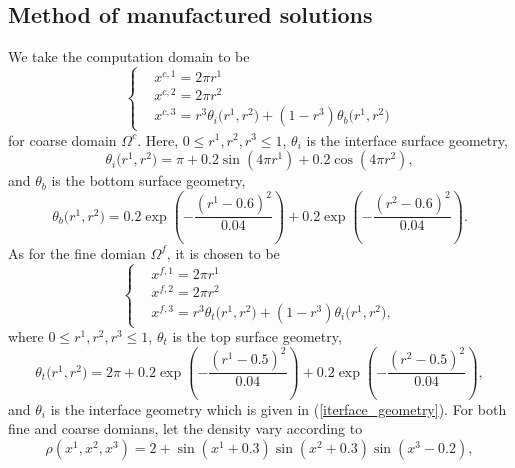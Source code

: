 \subsection{Method of manufactured solutions}\label{manufactured_sol}
We take the computation domain to be 
\begin{equation}\label{coarse_domain_manufactured}
\left\{
\begin{aligned}
& x^{c,1} = 2\pi r^1\\
& x^{c,2} = 2\pi r^2\\
& x^{c,3} = r^3\theta_i\big(r^1,r^2\big) + (1-r^3)\theta_b\big(r^1,r^2\big)
\end{aligned}
\right.
\end{equation}
for coarse domain $\Omega^c$. Here, $0\leq r^1, r^2, r^3\leq 1$, $\theta_i$ is the interface surface geometry,
\begin{equation}\label{iterface_geometry}
\theta_i\big(r^1,r^2\big) = \pi+0.2\sin(4\pi r^1)+0.2\cos(4\pi r^2),
\end{equation}
and 
$\theta_b$ is the bottom surface geometry,
\begin{equation}\label{bottom_geometry}
\theta_b\big(r^1,r^2\big) = 0.2\exp\left(-\frac{(r^1-0.6)^2}{0.04}\right)+0.2\exp\left(-\frac{(r^2-0.6)^2}{0.04}\right).
\end{equation}
As for the fine domian $\Omega^f$, it is chosen to be
\begin{equation}\label{fine_domain_manufactured}
\left\{
\begin{aligned}
& x^{f,1} = 2\pi r^1\\
& x^{f,2} = 2\pi r^2\\
& x^{f,3} = r^3\theta_t\big(r^1,r^2\big) + (1-r^3)\theta_i\big(r^1,r^2\big),
\end{aligned}
\right.
\end{equation}
where $0\leq r^1, r^2, r^3\leq 1$, $\theta_t$ is the top surface geometry,
\begin{equation}\label{top_geometry}
\theta_t\big(r^1,r^2\big) = 2\pi+0.2\exp\left(-\frac{(r^1-0.5)^2}{0.04}\right)+0.2\exp\left(-\frac{(r^2-0.5)^2}{0.04}\right),
\end{equation}
and $\theta_i$ is the interface geometry which is given in (\ref{iterface_geometry}). For both fine and coarse domians, let the density vary according to
\begin{equation}\label{density_function}
\rho(x^1,x^2,x^3) = 2 + \sin(x^1+0.3)\sin(x^2+0.3)\sin(x^3-0.2),
\end{equation}
